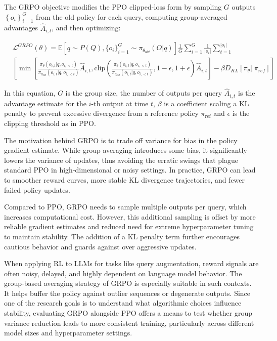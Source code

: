 The GRPO objective modifies the PPO clipped-loss form by sampling $G$ outputs $\left\{o_{i}\right\}_{i=1}^{G}$ from the old policy for each query, computing group-averaged advantages $\hat{A}_{i,t}$, and then optimizing:

\begin{equation}
\begin{split}
     & \mathcal{L}^{GRPO}(\theta) = \mathbb{E}[q \sim P(Q), \{o_i\}_{i=1}^G \sim \pi_{\theta_{old}}({O}|q)] \frac{1}{G}\sum_{i=1}^{G} \frac{1}{|{o}_i|}\sum_{t=1}^{|{o}_i|} \\
     & \left[\min\left[\frac{\pi_{\theta}(o_{i,t}|q, {o}_{i,<t})}{\pi_{\theta_{old}}(o_{i,t}|q, {o}_{i,<t})}\hat{A}_{i,t}, \text{clip}\left(\frac{\pi_{\theta}(o_{i,t}|q, {o}_{i,<t})}{\pi_{\theta_{old}}(o_{i,t}|q, {o}_{i,<t})}, 1-\epsilon, 1+\epsilon\right)\hat{A}_{i,t}\right] - \beta D_{KL}[\pi_{\theta}||\pi_{ref}]\right]
\end{split}     
\end{equation}

In this equation, $G$ is the group size, the number of outputs per query $\hat{A}_{i,t}$ is the advantage estimate for the $i$-th output at time $t$, $\beta$ is a coefficient scaling a KL penalty to prevent excessive divergence from a reference policy $\pi_{\text{ref}}$ and $\epsilon$ is the clipping threshold as in PPO.

The motivation behind GRPO is to trade off variance for bias in the policy gradient estimate. While group averaging introduces some bias, it significantly lowers the variance of updates, thus avoiding the erratic swings that plague standard PPO in high-dimensional or noisy settings. In practice, GRPO can lead to smoother reward curves, more stable KL divergence trajectories, and fewer failed policy updates.

Compared to PPO, GRPO needs to sample multiple outputs per query, which increases computational cost. However, this additional sampling is offset by more reliable gradient estimates and reduced need for extreme hyperparameter tuning to maintain stability. The addition of a KL penalty term further encourages cautious behavior and guards against over aggressive updates.

When applying RL to LLMs for tasks like query augmentation, reward signals are often noisy, delayed, and highly dependent on language model behavior. The group-based averaging strategy of GRPO is especially suitable in such contexts. It helps buffer the policy against outlier sequences or degenerate outputs. Since one of the research goals is to understand what algorithmic choices influence stability, evaluating GRPO alongside PPO offers a means to test whether group variance reduction leads to more consistent training, particularly across different model sizes and hyperparameter settings.
